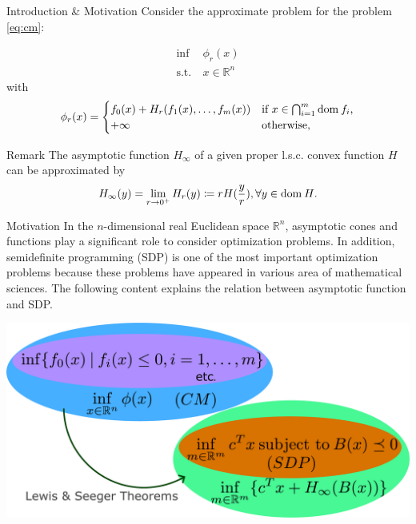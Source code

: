 \documentclass[aspectratio=169, dvipdfmx, 11pt]{beamer}
\newcommand{\NDemenstionalRealEuclideanSpace}{\mathbb{R}^n}
\newcommand{\Domain}[1]{\text{\rm dom\:${#1}$}} %
\begin{document}
\begin{frame}{Introduction \& Motivation}
  Consider the approximate problem for the problem \eqref{eq:cm}:

  \begin{equation}
    \begin{aligned}
      \inf \:& \phi_r(x) \\
      \text{s.t.} \:& x \in \NDemenstionalRealEuclideanSpace
    \end{aligned} \tag{CMr} \label{eq:cmr}
  \end{equation}
  with
  \begin{equation}
    \phi_r(x)=
    \begin{cases}
      f_0 (x) + H_r (f_1(x), \ldots, f_m(x)) & \text{if $x \in \bigcap_{i =1}^{m} \Domain{f_i}$,} \\
      +\infty      & \text{otherwise,} \notag
    \end{cases}
  \end{equation}

  \begin{alertblock}{Remark}
    The asymptotic function $H_\infty$ of a given proper l.s.c. convex function $H$ can be approximated by
    \begin{equation}
      H_{\infty}(y) = \lim_{r \to 0^+} H_r(y) \coloneqq  rH(\frac{y}{r}), \forall y \in \Domain{H}. \notag
    \end{equation}
  \end{alertblock}
\end{frame}

\begin{frame}{Motivation}
In the $n$-dimensional real Euclidean space $\NDemenstionalRealEuclideanSpace$, asymptotic cones and functions play a significant role to consider optimization problems. In addition, semidefinite programming (SDP) is one of the most important optimization problems because these problems have appeared in various area of mathematical sciences. The following content explains the relation between asymptotic function and SDP.
\bigskip

\centering
\includegraphics[keepaspectratio, scale=0.105]{figures/summary_of_presentation.eps}
\end{frame}
\end{document}
